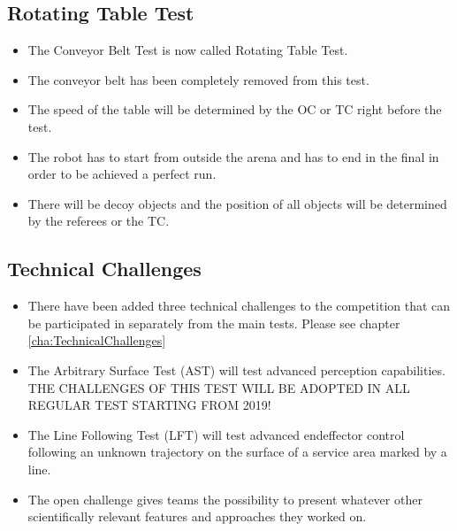 \subsection{Rotating Table Test}
\begin{itemize}
  \item The Conveyor Belt Test is now called Rotating Table Test.
  \item The conveyor belt has been completely removed from this test.
  \item The speed of the table will be determined by the OC or TC right before the test.
  \item The robot has to start from outside the arena and has to end in the final in order to be achieved a perfect run.
  \item There will be decoy objects and the position of all objects will be determined by the referees or the TC.
\end{itemize}

\subsection{Technical Challenges}
\begin{itemize}
  \item There have been added three technical challenges to the competition that can be participated in separately from the main tests. Please see chapter \ref{cha:TechnicalChallenges}
  \item The Arbitrary Surface Test (AST) will test advanced perception capabilities. THE CHALLENGES OF THIS TEST WILL BE ADOPTED IN ALL REGULAR TEST STARTING FROM 2019!
  \item The Line Following Test (LFT) will test advanced endeffector control following an unknown trajectory on the surface of a service area marked by a line.
  \item The open challenge gives teams the possibility to present whatever other scientifically relevant features and approaches they worked on.
\end{itemize}
